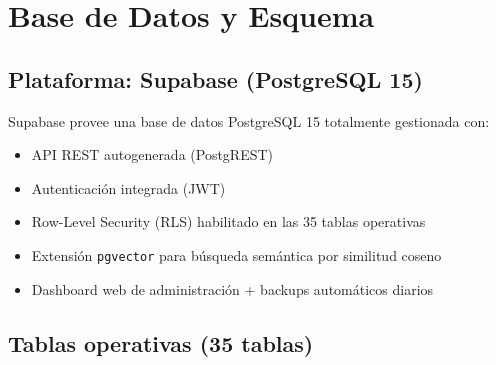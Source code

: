 \documentclass[12pt,a4paper]{report}
\begin{document}
\chapter{Base de Datos y Esquema}

\section{Plataforma: Supabase (PostgreSQL 15)}

Supabase provee una base de datos PostgreSQL 15 totalmente gestionada con:
\begin{itemize}
  \item API REST autogenerada (PostgREST)
  \item Autenticación integrada (JWT)
  \item Row-Level Security (RLS) habilitado en las 35 tablas operativas
  \item Extensión \texttt{pgvector} para búsqueda semántica por similitud coseno
  \item Dashboard web de administración + backups automáticos diarios
\end{itemize}

\section{Tablas operativas (35 tablas)}
\end{document}
